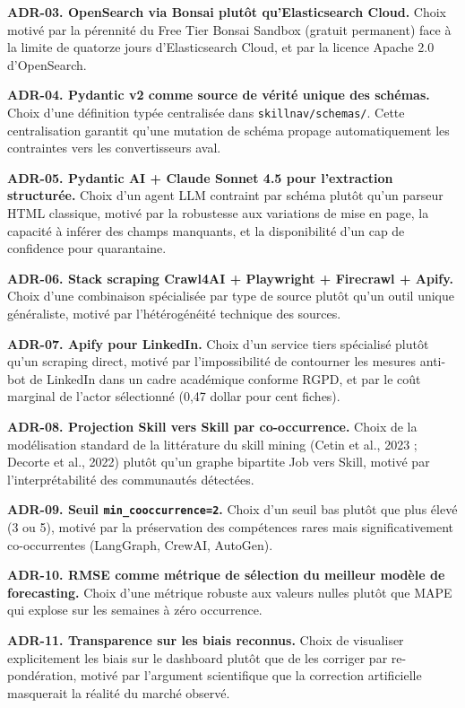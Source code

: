 \documentclass[11pt,a4paper,openany]{report}
\begin{document}
\textbf{ADR-03. OpenSearch via Bonsai plut\^ot qu'Elasticsearch Cloud.} Choix motiv\'e par la p\'erennit\'e du Free Tier Bonsai Sandbox (gratuit permanent) face \`a la limite de quatorze jours d'Elasticsearch Cloud, et par la licence Apache 2.0 d'OpenSearch.

\textbf{ADR-04. Pydantic v2 comme source de v\'erit\'e unique des sch\'emas.} Choix d'une d\'efinition typ\'ee centralis\'ee dans \texttt{skillnav/schemas/}. Cette centralisation garantit qu'une mutation de sch\'ema propage automatiquement les contraintes vers les convertisseurs aval.

\textbf{ADR-05. Pydantic AI + Claude Sonnet 4.5 pour l'extraction structur\'ee.} Choix d'un agent LLM contraint par sch\'ema plut\^ot qu'un parseur HTML classique, motiv\'e par la robustesse aux variations de mise en page, la capacit\'e \`a inf\'erer des champs manquants, et la disponibilit\'e d'un cap de confidence pour quarantaine.

\textbf{ADR-06. Stack scraping Crawl4AI + Playwright + Firecrawl + Apify.} Choix d'une combinaison sp\'ecialis\'ee par type de source plut\^ot qu'un outil unique g\'en\'eraliste, motiv\'e par l'h\'et\'erog\'en\'eit\'e technique des sources.

\textbf{ADR-07. Apify pour LinkedIn.} Choix d'un service tiers sp\'ecialis\'e plut\^ot qu'un scraping direct, motiv\'e par l'impossibilit\'e de contourner les mesures anti-bot de LinkedIn dans un cadre acad\'emique conforme RGPD, et par le co\^ut marginal de l'actor s\'electionn\'e (0,47 dollar pour cent fiches).

\textbf{ADR-08. Projection Skill vers Skill par co-occurrence.} Choix de la mod\'elisation standard de la litt\'erature du skill mining (Cetin et al., 2023 ; Decorte et al., 2022) plut\^ot qu'un graphe bipartite Job vers Skill, motiv\'e par l'interpr\'etabilit\'e des communaut\'es d\'etect\'ees.

\textbf{ADR-09. Seuil \texttt{min\_cooccurrence=2}.} Choix d'un seuil bas plut\^ot que plus \'elev\'e (3 ou 5), motiv\'e par la pr\'eservation des comp\'etences rares mais significativement co-occurrentes (LangGraph, CrewAI, AutoGen).

\textbf{ADR-10. RMSE comme m\'etrique de s\'election du meilleur mod\`ele de forecasting.} Choix d'une m\'etrique robuste aux valeurs nulles plut\^ot que MAPE qui explose sur les semaines \`a z\'ero occurrence.

\textbf{ADR-11. Transparence sur les biais reconnus.} Choix de visualiser explicitement les biais sur le dashboard plut\^ot que de les corriger par re-pond\'eration, motiv\'e par l'argument scientifique que la correction artificielle masquerait la r\'ealit\'e du march\'e observ\'e.
\end{document}
